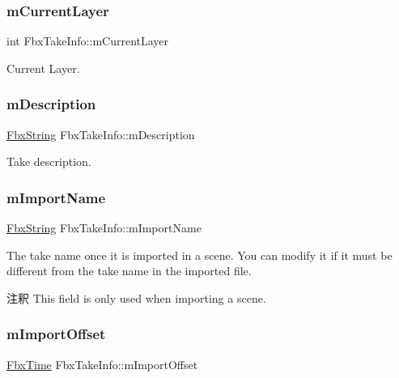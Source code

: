 \subsubsection{\texorpdfstring{m\+Current\+Layer}{mCurrentLayer}}
{\footnotesize\ttfamily int Fbx\+Take\+Info\+::m\+Current\+Layer}



Current Layer. 

\mbox{\label{class_fbx_take_info_a1104cb914ad2cf041aa6b9cdd956e739}} 
\subsubsection{\texorpdfstring{m\+Description}{mDescription}}
{\footnotesize\ttfamily \hyperlink{class_fbx_string}{Fbx\+String} Fbx\+Take\+Info\+::m\+Description}



Take description. 

\mbox{\label{class_fbx_take_info_ac767c10374a8759594b16aedafae83f9}} 
\subsubsection{\texorpdfstring{m\+Import\+Name}{mImportName}}
{\footnotesize\ttfamily \hyperlink{class_fbx_string}{Fbx\+String} Fbx\+Take\+Info\+::m\+Import\+Name}

The take name once it is imported in a scene. You can modify it if it must be different from the take name in the imported file. \begin{DoxyRemark}{注釈}
This field is only used when importing a scene. 
\end{DoxyRemark}
\mbox{\label{class_fbx_take_info_a710e53c9ae01db3c19d895aee1d5b6cc}} 
\subsubsection{\texorpdfstring{m\+Import\+Offset}{mImportOffset}}
{\footnotesize\ttfamily \hyperlink{class_fbx_time}{Fbx\+Time} Fbx\+Take\+Info\+::m\+Import\+Offset}

